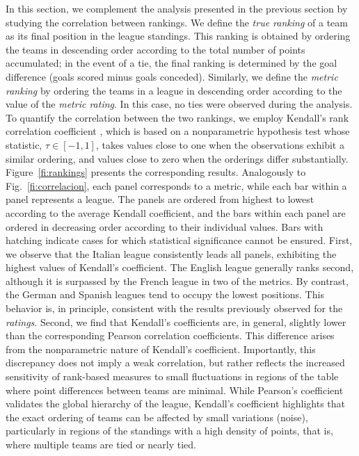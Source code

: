 \documentclass[preprint, amsmath,amssymb, pre]{revtex4-2}
\begin{document}
In this section, we complement the analysis presented in the previous section by studying the correlation between rankings.
%
We define the \textit{true ranking} of a team as its final position in the league standings.
%
This ranking is obtained by ordering the teams in descending order according to the total number of points accumulated; in the event of a tie, the final ranking is determined by the goal difference (goals scored minus goals conceded).
%
Similarly, we define the \textit{metric ranking} by ordering the teams in a league in descending order according to the value of the \textit{metric rating}.
%
In this case, no ties were observed during the analysis.
%
To quantify the correlation between the two rankings, we employ Kendall’s rank correlation coefficient \cite{kendall1938new}, which is based on a nonparametric hypothesis test whose statistic, $\tau \in [-1,1]$, takes values close to one when the observations exhibit a similar ordering, and values close to zero when the orderings differ substantially.
%
Figure~\ref{fi:rankings} presents the corresponding results.
%
Analogously to Fig.~\ref{fi:correlacion}, each panel corresponds to a metric, while each bar within a panel represents a league.
%
The panels are ordered from highest to lowest according to the average Kendall coefficient, and the bars within each panel are ordered in decreasing order according to their individual values.
%
Bars with hatching indicate cases for which statistical significance cannot be ensured.
%
First, we observe that the Italian league consistently leads all panels, exhibiting the highest values of Kendall’s coefficient.
%
The English league generally ranks second, although it is surpassed by the French league in two of the metrics.
%
By contrast, the German and Spanish leagues tend to occupy the lowest positions.
%
This behavior is, in principle, consistent with the results previously observed for the \textit{ratings}.
%
Second, we find that Kendall’s coefficients are, in general, slightly lower than the corresponding Pearson correlation coefficients.
%
This difference arises from the nonparametric nature of Kendall’s coefficient.
%
Importantly, this discrepancy does not imply a weak correlation, but rather reflects the increased sensitivity of rank-based measures to small fluctuations in regions of the table where point differences between teams are minimal.
%
While Pearson’s coefficient validates the global hierarchy of the league, Kendall’s coefficient highlights that the exact ordering of teams can be affected by small variations (noise), particularly in regions of the standings with a high density of points, that is, where multiple teams are tied or nearly tied.
\end{document}
